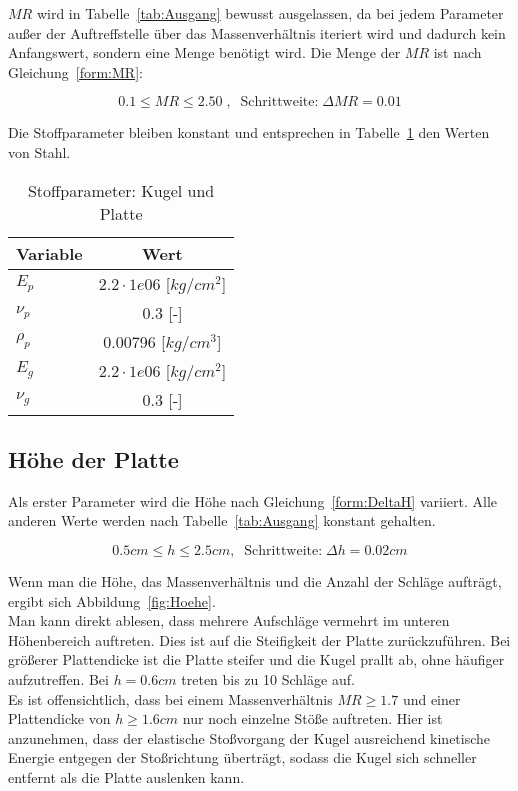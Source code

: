 $MR$ wird in Tabelle~\ref{tab:Ausgang} bewusst ausgelassen, da bei jedem Parameter außer der Auftreffstelle über das Massenverhältnis iteriert wird und dadurch kein Anfangswert, sondern eine Menge benötigt wird. Die Menge der $MR$ ist nach Gleichung~\ref{form:MR}:

\begin{equation}
	\label{form:MR}
	0.1 \leq MR \leq 2.50 \; , \;\; \mbox{Schrittweite:} \; \Delta MR = 0.01
\end{equation}

Die Stoffparameter bleiben konstant und entsprechen in Tabelle~\ref{tab:Stoff} den Werten von Stahl.

\begin{table}[H]
	\begin{center}
		\caption{Stoffparameter: Kugel und Platte}
		\label{tab:Stoff}
		\begin{tabular}{l|c}
			\textbf{Variable} & \textbf{Wert}\\
			\hline
			$E_{p}$ & $2.2 \cdot 1e06$ [$kg/cm^2$]\\
			$\nu_{p}$ & 0.3 [-]\\
			$\rho_{p}$ & 0.00796 [$kg/cm^{3}$]\\
			\hline
			$E_{g}$ &  $2.2 \cdot 1e06$ [$kg/cm^2$]\\
			$\nu_{g}$ & 0.3 [-]\\		
		\end{tabular}
	\end{center}
\end{table}

\subsection{Höhe der Platte}

Als erster Parameter wird die Höhe nach Gleichung~\ref{form:DeltaH} variiert. Alle anderen Werte werden nach Tabelle~\ref{tab:Ausgang} konstant gehalten.

\begin{equation}
	\label{form:DeltaH}
	0.5 cm \leq h \leq 2.5 cm, \; \; \mbox{Schrittweite:} \; \Delta h = 0.02 cm
\end{equation}

Wenn man die Höhe, das Massenverhältnis und die Anzahl der Schläge aufträgt, ergibt sich Abbildung~\ref{fig:Hoehe}.\\
Man kann direkt ablesen, dass mehrere Aufschläge vermehrt im unteren Höhenbereich auftreten. Dies ist auf die Steifigkeit der Platte zurückzuführen. Bei größerer Plattendicke ist die Platte steifer und die Kugel prallt ab, ohne häufiger aufzutreffen. Bei $h = 0.6 cm$ treten bis zu 10 Schläge auf.\\
Es ist offensichtlich, dass bei einem Massenverhältnis $MR \geq 1.7$ und einer Plattendicke von $h \geq 1.6 cm$ nur noch einzelne Stöße auftreten. Hier ist anzunehmen, dass der elastische Stoßvorgang der Kugel ausreichend kinetische Energie entgegen der Stoßrichtung überträgt, sodass die Kugel sich schneller entfernt als die Platte auslenken kann. \\

